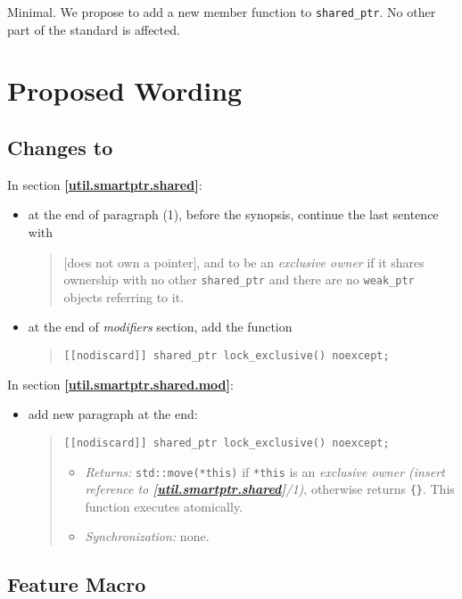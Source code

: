 \documentclass[11pt]{article}
\newcommand{\wgpaper}[1]{\href{https://wg21.link/#1}{#1}}
\newcommand{\isref}[1]{\textbf{[\wgpaper{#1}]}}
\newcommand{\sptr}{\texttt{shared\_ptr}}
\begin{document}
Minimal. We propose to add a new member function to \sptr{}. No other
part of the standard is affected.

\section{Proposed Wording}

\subsection{Changes to \cite{cpp2a}}

In section \isref{util.smartptr.shared}:

\begin{itemize}
\item at the end of paragraph (1), before the synopsis, continue the last sentence with
  \begin{quotation}
    [does not own a pointer], and to be an \emph{exclusive owner} if
    it shares ownership with no other \sptr{} and there are no
    \texttt{weak\_ptr} objects referring to it.
  \end{quotation}
\item at the end of \textit{modifiers} section, add the function
  \begin{quotation}
    \texttt{[[nodiscard]] shared\_ptr lock\_exclusive() noexcept;}
  \end{quotation}
\end{itemize}

In section \isref{util.smartptr.shared.mod}:

\begin{itemize}
\item add new paragraph at the end:
  \begin{quotation}
    \texttt{[[nodiscard]] shared\_ptr lock\_exclusive() noexcept;}
    \begin{itemize}
    \item\textit{Returns:} \texttt{std::move(*this)} if \texttt{*this}
      is an \textit{exclusive owner (insert reference to
        \isref{util.smartptr.shared}/1)}, otherwise returns
      \texttt{\{\}}. This function executes atomically.
    \item\textit{Synchronization:} none.
    \end{itemize}
  \end{quotation}
\end{itemize}

\subsection{Feature Macro}
\end{document}
